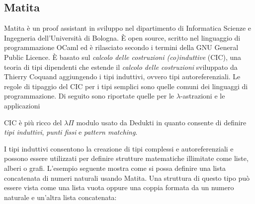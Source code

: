\documentclass[12pt,a4paper]{mimosis}
\begin{document}
\begin{prooftree}
\end{prooftree}


\begin{prooftree}
\end{prooftree}

\subsection{Matita}
Matita è un  proof assistant in sviluppo nel dipartimento di Informatica Scienze
e Ingegneria dell'Università di Bologna. È open source, scritto nel linguaggio di
programmazione OCaml ed è rilasciato secondo i termini della GNU General Public Licence.
È basato sul \textit{calcolo delle costruzioni (co)induttive} (CIC), una teoria di tipi
dipendenti che estende il \textit{calcolo delle costruzioni} sviluppato da
Thierry Coquand aggiungendo i tipi induttivi, ovvero tipi autoreferenziali.
Le regole di tipaggio del CIC per i tipi semplici sono quelle comuni dei linguaggi
di programmazione. Di seguito sono riportate quelle per le  $\lambda$-astrazioni
e le applicazioni 

\begin{prooftree}
\end{prooftree}

\begin{prooftree}
\end{prooftree}


CIC è più ricco del $\lambda\Pi$ modulo usato da Dedukti in quanto consente di definire 
\textit{tipi induttivi}, \textit{punti fissi} e \textit{pattern matching}.


I tipi induttivi consentono la creazione di tipi complessi e autoreferenziali e possono
essere utilizzati per definire strutture matematiche illimitate come liste,
alberi o grafi. L'esempio seguente mostra come si possa definire una lista concatenata
di numeri naturali usando Matita. Una struttura di questo tipo può essere vista come
una lista vuota oppure una coppia formata da un numero naturale e un'altra lista 
concatenata:
\end{document}
